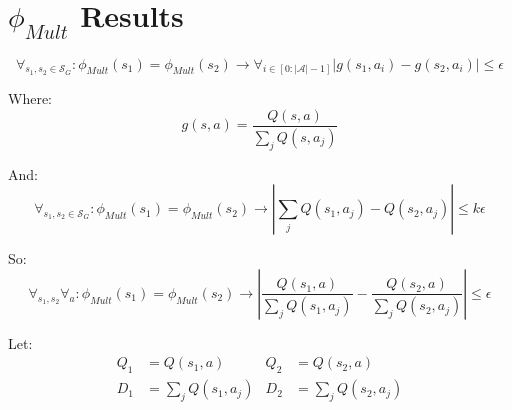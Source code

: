 \documentclass[11pt]{amsart}
\begin{document}
%
%
%

\newpage
\section{$\phi_{Mult}$ Results}

\begin{equation}
\forall_{s_1, s_2 \in \mathcal{S}_G} : \phi_{Mult}(s_1) = \phi_{Mult}(s_2) \rightarrow \forall_{i \in [0:|\mathcal{A}| - 1]} | g(s_1, a_i) - g(s_2, a_i) | \leq \epsilon
\label{eq:phi_d}
\end{equation}

Where:
\begin{equation}
g(s,a) = \frac{Q(s,a)}{\sum_j Q(s,a_j)}
\end{equation}

And:
\begin{equation}
\forall_{s_1, s_2 \in \mathcal{S}_G} : \phi_{Mult}(s_1) = \phi_{Mult}(s_2) \rightarrow |\sum_j Q(s_1,a_j) - Q(s_2,a_j) | \leq k\epsilon
\end{equation}

So:
\begin{equation}
\forall_{s_1,s_2} \forall_a : \phi_{Mult}(s_1) = \phi_{Mult}(s_2) \rightarrow | \frac{Q(s_1,a)}{\sum_j Q(s_1,a_j)} - \frac{Q(s_2,a)}{\sum_j Q(s_2,a_j)} | \leq \epsilon
\end{equation}

Let:
\begin{align}
Q_1 &= Q(s_1,a) &Q_2 &= Q(s_2,a) \\
D_1 &= \sum_j Q(s_1,a_j) &D_2 &= \sum_j Q(s_2,a_j) 
\end{align}
\end{document}
